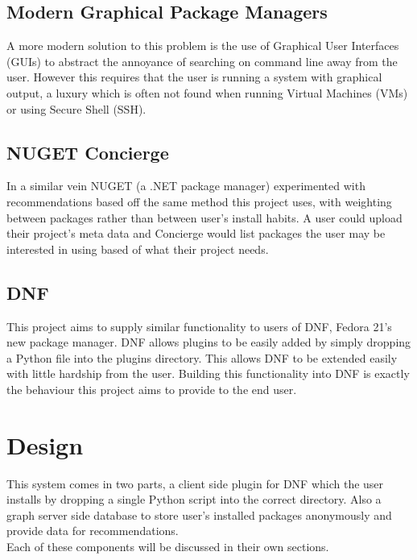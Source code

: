 \documentclass{l4proj}
\begin{document}
\section{Modern Graphical Package Managers}
A more modern solution to this problem is the use of Graphical User Interfaces (GUIs) to abstract the annoyance of searching on command line away from the user. However this requires that the user is running a system with graphical output, a luxury which is often not found when running Virtual Machines (VMs) or using Secure Shell (SSH).\\

\section{NUGET Concierge}
In a similar vein NUGET (a .NET package manager) experimented with recommendations based off the same method this project uses, with weighting between packages rather than between user's install habits. A user could upload their project's meta data and Concierge would list packages the user may be interested in using based of what their project needs.\\

\section{DNF}
This project aims to supply similar functionality to users of DNF, Fedora 21's new package manager. DNF allows plugins to be easily added by simply dropping a Python file into the plugins directory. This allows DNF to be extended easily with little hardship from the user. Building this functionality into DNF is exactly the behaviour this project aims to provide to the end user.\\ 

 
\chapter{Design}
This system comes in two parts, a client side plugin for DNF which the user installs by dropping a single Python script into the correct directory. Also a graph server side database to store user's installed packages anonymously and provide data for recommendations.\\
Each of these components will be discussed in their own sections.
\end{document}

